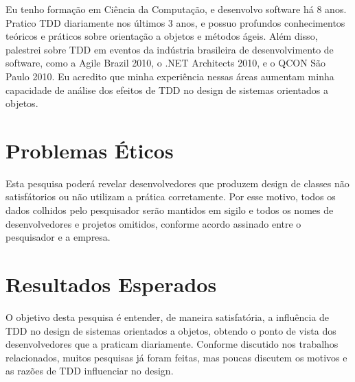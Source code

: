 Eu tenho formação em Ciência da Computação, e desenvolvo software há 8
anos. Pratico TDD diariamente nos últimos 3 anos, e possuo profundos
conhecimentos teóricos e práticos sobre orientação a objetos e métodos ágeis.
Além disso, palestrei sobre TDD em eventos da indústria brasileira
de desenvolvimento de software, como a Agile Brazil 2010, o .NET Architects
2010, e o QCON São Paulo 2010. Eu acredito que minha experiência nessas
áreas aumentam minha capacidade de análise dos efeitos de TDD no design de sistemas 
orientados a objetos.

\section{Problemas Éticos}
\label{sec:planejamento-etica}

Esta pesquisa poderá revelar desenvolvedores que produzem design de classes não
satisfátorios ou não utilizam a prática corretamente.
Por esse motivo, todos os dados colhidos pelo pesquisador serão mantidos em
sigilo e todos os nomes de desenvolvedores e projetos omitidos, conforme acordo 
assinado entre o pesquisador e a empresa.

\section{Resultados Esperados}
\label{sec:planejamento-resultados-esperados}

O objetivo desta pesquisa é entender, de maneira satisfatória, a influência de 
TDD no design de sistemas orientados a objetos, obtendo o ponto de vista dos 
desenvolvedores que a praticam diariamente. Conforme discutido nos trabalhos 
relacionados, muitos pesquisas já foram feitas, mas poucas discutem os motivos 
e as razões de TDD influenciar no design.
